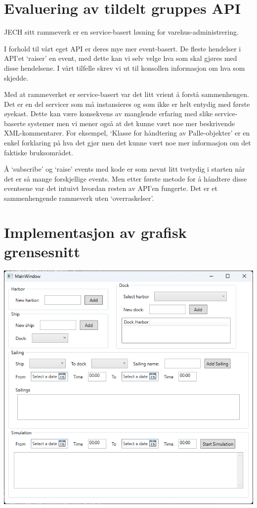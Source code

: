 \documentclass[12pt]{article}
\begin{document}
\section{Evaluering av tildelt gruppes API}

JECH sitt rammeverk er en service-basert løsning for varehus-administrering.

I forhold til vårt eget API er deres mye mer event-basert. De fleste hendelser i API'et
`raiser' en event, med dette kan vi selv velge hva som skal gjøres med disse hendelsene. I vårt tilfelle 
skrev vi ut til konsollen informasjon om hva som skjedde.

Med at rammeverket er service-basert var det litt vrient å forstå sammenhengen. Det er en del servicer som må
instansieres og som ikke er helt entydig med første øyekast. Dette kan være konsekvens av manglende erfaring med slike service-baserte 
systemer men vi mener også at det kunne vært noe mer beskrivende XML-kommentarer. For eksempel, `Klasse for håndtering av Palle-objekter'
er en enkel forklaring på hva det gjør men det kunne vært noe mer informasjon om det faktiske bruksområdet. 

Å `subscribe' og `raise' events med kode er som nevnt litt tvetydig i starten når det er så mange forskjellige events.
Men etter første metode for å håndtere disse eventsene var det intuivt hvordan resten av API'en fungerte. Det er et sammenhengende
rammeverk uten `overraskelser'.

\section{Implementasjon av grafisk grensesnitt}
\includegraphics*[scale=0.6]{gui.png}
\end{document}
